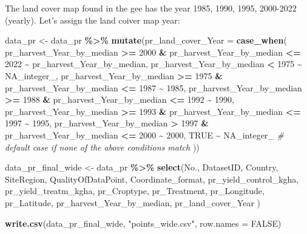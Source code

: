 \documentclass[
]{article}
\newenvironment{Shaded}{\begin{snugshade}}{\end{snugshade}}
\newcommand{\AttributeTok}[1]{\textcolor[rgb]{0.13,0.29,0.53}{#1}}
\newcommand{\CommentTok}[1]{\textcolor[rgb]{0.56,0.35,0.01}{\textit{#1}}}
\newcommand{\ConstantTok}[1]{\textcolor[rgb]{0.56,0.35,0.01}{#1}}
\newcommand{\DecValTok}[1]{\textcolor[rgb]{0.00,0.00,0.81}{#1}}
\newcommand{\FunctionTok}[1]{\textcolor[rgb]{0.13,0.29,0.53}{\textbf{#1}}}
\newcommand{\NormalTok}[1]{#1}
\newcommand{\OtherTok}[1]{\textcolor[rgb]{0.56,0.35,0.01}{#1}}
\newcommand{\SpecialCharTok}[1]{\textcolor[rgb]{0.81,0.36,0.00}{\textbf{#1}}}
\newcommand{\StringTok}[1]{\textcolor[rgb]{0.31,0.60,0.02}{#1}}
\begin{document}
The land cover map found in the gee has the year 1985, 1990, 1995,
2000-2022 (yearly). Let's assign the land coiver map year:

\begin{Shaded}
\begin{Highlighting}[]
\NormalTok{data\_pr }\OtherTok{\textless{}{-}}\NormalTok{ data\_pr }\SpecialCharTok{\%\textgreater{}\%}
  \FunctionTok{mutate}\NormalTok{(}\AttributeTok{pr\_land\_cover\_Year =} \FunctionTok{case\_when}\NormalTok{(}
\NormalTok{    pr\_harvest\_Year\_by\_median }\SpecialCharTok{\textgreater{}=} \DecValTok{2000} \SpecialCharTok{\&}\NormalTok{ pr\_harvest\_Year\_by\_median }\SpecialCharTok{\textless{}=} \DecValTok{2022} \SpecialCharTok{\textasciitilde{}}\NormalTok{ pr\_harvest\_Year\_by\_median,}
\NormalTok{    pr\_harvest\_Year\_by\_median }\SpecialCharTok{\textless{}} \DecValTok{1975} \SpecialCharTok{\textasciitilde{}} \ConstantTok{NA\_integer\_}\NormalTok{,}
\NormalTok{    pr\_harvest\_Year\_by\_median }\SpecialCharTok{\textgreater{}=} \DecValTok{1975} \SpecialCharTok{\&}\NormalTok{ pr\_harvest\_Year\_by\_median }\SpecialCharTok{\textless{}=} \DecValTok{1987} \SpecialCharTok{\textasciitilde{}} \DecValTok{1985}\NormalTok{,}
\NormalTok{    pr\_harvest\_Year\_by\_median }\SpecialCharTok{\textgreater{}=} \DecValTok{1988} \SpecialCharTok{\&}\NormalTok{ pr\_harvest\_Year\_by\_median }\SpecialCharTok{\textless{}=} \DecValTok{1992} \SpecialCharTok{\textasciitilde{}} \DecValTok{1990}\NormalTok{,}
\NormalTok{    pr\_harvest\_Year\_by\_median }\SpecialCharTok{\textgreater{}=} \DecValTok{1993} \SpecialCharTok{\&}\NormalTok{ pr\_harvest\_Year\_by\_median }\SpecialCharTok{\textless{}=} \DecValTok{1997} \SpecialCharTok{\textasciitilde{}} \DecValTok{1995}\NormalTok{,}
\NormalTok{    pr\_harvest\_Year\_by\_median }\SpecialCharTok{\textgreater{}} \DecValTok{1997} \SpecialCharTok{\&}\NormalTok{ pr\_harvest\_Year\_by\_median }\SpecialCharTok{\textless{}=} \DecValTok{2000} \SpecialCharTok{\textasciitilde{}} \DecValTok{2000}\NormalTok{,}
    \ConstantTok{TRUE} \SpecialCharTok{\textasciitilde{}} \ConstantTok{NA\_integer\_}  \CommentTok{\# default case if none of the above conditions match}
\NormalTok{  ))}
\end{Highlighting}
\end{Shaded}

\begin{Shaded}
\begin{Highlighting}[]
\NormalTok{data\_pr\_final\_wide }\OtherTok{\textless{}{-}} 
\NormalTok{data\_pr }\SpecialCharTok{\%\textgreater{}\%} 
  \FunctionTok{select}\NormalTok{(No., DatasetID, Country, SiteRegion, QualityOfDataPoint, Coordinate\_format, pr\_yield\_control\_kgha, pr\_yield\_treatm\_kgha, pr\_Croptype, pr\_Treatment, pr\_Longitude, pr\_Latitude, pr\_harvest\_Year\_by\_median, pr\_land\_cover\_Year )}

\FunctionTok{write.csv}\NormalTok{(data\_pr\_final\_wide, }\StringTok{"points\_wide.csv"}\NormalTok{, }\AttributeTok{row.names =} \ConstantTok{FALSE}\NormalTok{)}
\end{Highlighting}
\end{Shaded}
\end{document}
